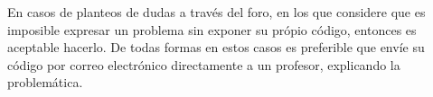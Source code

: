 \documentclass[]{article}
\begin{document}
En casos de planteos de dudas a través del foro, en los que considere
que es imposible expresar un problema sin exponer su própio código,
entonces es aceptable hacerlo. De todas formas en estos casos es
preferible que envíe su código por correo electrónico directamente a un
profesor, explicando la problemática.
\end{document}
